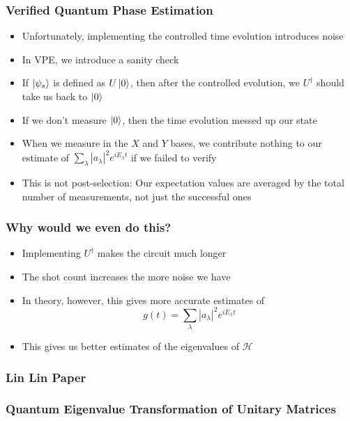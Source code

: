 \documentclass[aspectratio=169]{beamer}
\begin{document}
\begin{frame}
\frametitle{Verified Quantum Phase Estimation}
\begin{itemize}[<+->]
\item Unfortunately, implementing the controlled time evolution introduces noise\item In VPE, we introduce a sanity check
\item If $\ket{\psi_s}$ is defined as $U\ket{0}$, then after the controlled evolution, we $U^\dagger$ should take us back to $\ket{0}$
\item If we don't measure $\ket{0}$, then the time evolution messed up our state
\item When we measure in the $X$ and $Y$ bases, we contribute nothing to our estimate of $\sum_{\lambda}|a_\lambda|^2 e^{iE_\lambda t}$ if we failed to verify
\item This is not post-selection: Our expectation values are averaged by the total number of measurements, not just the successful ones
\end{itemize} 
\end{frame}

\begin{frame}
\frametitle{Why would we even do this?}
\begin{itemize}[<+->]
\item Implementing $U^{\dagger}$ makes the circuit much longer
\item The shot count increases the more noise we have
\item In theory, however, this gives more accurate estimates of
\begin{equation}
g(t) = \sum_{\lambda}|a_\lambda|^2 e^{iE_\lambda t}
\end{equation}
\item This gives us better estimates of the eigenvalues of $\mathcal{H}$
\end{itemize}
\end{frame}

\begin{frame}
\frametitle{Lin Lin Paper}
\end{frame}

\begin{frame}
\frametitle{Quantum Eigenvalue Transformation of Unitary Matrices}
\end{frame}
\end{document}
